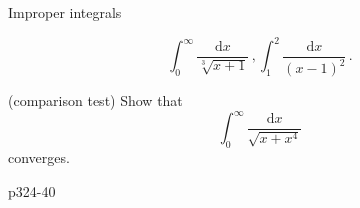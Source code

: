 \begin{frame}{Improper integrals}

\begin{example}
\[
\int_{0}^{\infty}\frac{\mathrm{d}x}{\sqrt[3]{x+1}}\,,\int_{1}^{2}\frac{\mathrm{d}x}{\left(x-1\right)^{2}}\,.
\]

\end{example}



\begin{example}
(comparison test) Show that
\[
\int_{0}^{\infty}\frac{\mathrm{d}x}{\sqrt{x+x^{4}}}
\]
converges.
\end{example}



\begin{example}
p324-40
\end{example}

\end{frame}



